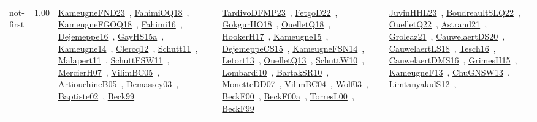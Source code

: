 {\begin{longtable}{p{3cm}r>{\raggedright\arraybackslash}p{6cm}>{\raggedright\arraybackslash}p{6cm}>{\raggedright\arraybackslash}p{8cm}}
\index{not-first}\index{Algorithms!not-first}not-first &  1.00 & \href{../works/KameugneFND23.pdf}{KameugneFND23}~\cite{KameugneFND23}, \href{../works/FahimiOQ18.pdf}{FahimiOQ18}~\cite{FahimiOQ18}, \href{../works/KameugneFGOQ18.pdf}{KameugneFGOQ18}~\cite{KameugneFGOQ18}, \href{../works/Fahimi16.pdf}{Fahimi16}~\cite{Fahimi16}, \href{../works/Dejemeppe16.pdf}{Dejemeppe16}~\cite{Dejemeppe16}, \href{../works/GayHS15a.pdf}{GayHS15a}~\cite{GayHS15a}, \href{../works/Kameugne14.pdf}{Kameugne14}~\cite{Kameugne14}, \href{../works/Clercq12.pdf}{Clercq12}~\cite{Clercq12}, \href{../works/Schutt11.pdf}{Schutt11}~\cite{Schutt11}, \href{../works/Malapert11.pdf}{Malapert11}~\cite{Malapert11}, \href{../works/SchuttFSW11.pdf}{SchuttFSW11}~\cite{SchuttFSW11}, \href{../works/MercierH07.pdf}{MercierH07}~\cite{MercierH07}, \href{../works/VilimBC05.pdf}{VilimBC05}~\cite{VilimBC05}, \href{../works/ArtiouchineB05.pdf}{ArtiouchineB05}~\cite{ArtiouchineB05}, \href{../works/Demassey03.pdf}{Demassey03}~\cite{Demassey03}, \href{../works/Baptiste02.pdf}{Baptiste02}~\cite{Baptiste02}, \href{../works/Beck99.pdf}{Beck99}~\cite{Beck99} & \href{../works/TardivoDFMP23.pdf}{TardivoDFMP23}~\cite{TardivoDFMP23}, \href{../works/FetgoD22.pdf}{FetgoD22}~\cite{FetgoD22}, \href{../works/GokgurHO18.pdf}{GokgurHO18}~\cite{GokgurHO18}, \href{../works/OuelletQ18.pdf}{OuelletQ18}~\cite{OuelletQ18}, \href{../works/HookerH17.pdf}{HookerH17}~\cite{HookerH17}, \href{../works/Kameugne15.pdf}{Kameugne15}~\cite{Kameugne15}, \href{../works/DejemeppeCS15.pdf}{DejemeppeCS15}~\cite{DejemeppeCS15}, \href{../works/KameugneFSN14.pdf}{KameugneFSN14}~\cite{KameugneFSN14}, \href{../works/Letort13.pdf}{Letort13}~\cite{Letort13}, \href{../works/OuelletQ13.pdf}{OuelletQ13}~\cite{OuelletQ13}, \href{../works/SchuttW10.pdf}{SchuttW10}~\cite{SchuttW10}, \href{../works/Lombardi10.pdf}{Lombardi10}~\cite{Lombardi10}, \href{../works/BartakSR10.pdf}{BartakSR10}~\cite{BartakSR10}, \href{../works/MonetteDD07.pdf}{MonetteDD07}~\cite{MonetteDD07}, \href{../works/VilimBC04.pdf}{VilimBC04}~\cite{VilimBC04}, \href{../works/Wolf03.pdf}{Wolf03}~\cite{Wolf03}, \href{../works/BeckF00.pdf}{BeckF00}~\cite{BeckF00}, \href{../works/BeckF00a.pdf}{BeckF00a}~\cite{BeckF00a}, \href{../works/TorresL00.pdf}{TorresL00}~\cite{TorresL00}, \href{../works/BeckF99.pdf}{BeckF99}~\cite{BeckF99} & \href{../works/JuvinHHL23.pdf}{JuvinHHL23}~\cite{JuvinHHL23}, \href{../works/BoudreaultSLQ22.pdf}{BoudreaultSLQ22}~\cite{BoudreaultSLQ22}, \href{../works/OuelletQ22.pdf}{OuelletQ22}~\cite{OuelletQ22}, \href{../works/Astrand21.pdf}{Astrand21}~\cite{Astrand21}, \href{../works/Groleaz21.pdf}{Groleaz21}~\cite{Groleaz21}, \href{../works/CauwelaertDS20.pdf}{CauwelaertDS20}~\cite{CauwelaertDS20}, \href{../works/CauwelaertLS18.pdf}{CauwelaertLS18}~\cite{CauwelaertLS18}, \href{../works/Tesch16.pdf}{Tesch16}~\cite{Tesch16}, \href{../works/CauwelaertDMS16.pdf}{CauwelaertDMS16}~\cite{CauwelaertDMS16}, \href{../works/GrimesH15.pdf}{GrimesH15}~\cite{GrimesH15}, \href{../works/KameugneF13.pdf}{KameugneF13}~\cite{KameugneF13}, \href{../works/ChuGNSW13.pdf}{ChuGNSW13}~\cite{ChuGNSW13}, \href{../works/LimtanyakulS12.pdf}{LimtanyakulS12}~\cite{LimtanyakulS12}, 
\end{longtable}}

